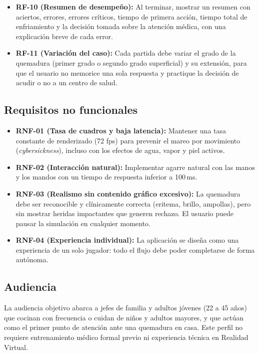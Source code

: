 \documentclass[11pt,letterpaper]{article}
\begin{document}
\begin{itemize}
  \item \textbf{RF-10 (Resumen de desempeño):} Al terminar, mostrar un resumen con aciertos, errores, errores críticos, tiempo de primera acción, tiempo total de enfriamiento y la decisión tomada sobre la atención médica, con una explicación breve de cada error.
  \item \textbf{RF-11 (Variación del caso):} Cada partida debe variar el grado de la quemadura (primer grado o segundo grado superficial) y su extensión, para que el usuario no memorice una sola respuesta y practique la decisión de acudir o no a un centro de salud.
\end{itemize}

\subsection{Requisitos no funcionales}

\begin{itemize}
  \item \textbf{RNF-01 (Tasa de cuadros y baja latencia):} Mantener una tasa constante de renderizado (72 fps) para prevenir el mareo por movimiento (\textit{cybersickness}), incluso con los efectos de agua, vapor y piel activos.
  \item \textbf{RNF-02 (Interacción natural):} Implementar agarre natural con las manos y los mandos con un tiempo de respuesta inferior a 100\,ms.
  \item \textbf{RNF-03 (Realismo sin contenido gráfico excesivo):} La quemadura debe ser reconocible y clínicamente correcta (eritema, brillo, ampollas), pero sin mostrar heridas impactantes que generen rechazo. El usuario puede pausar la simulación en cualquier momento.
  \item \textbf{RNF-04 (Experiencia individual):} La aplicación se diseña como una experiencia de un solo jugador: todo el flujo debe poder completarse de forma autónoma.
\end{itemize}

\subsection{Audiencia}

La audiencia objetivo abarca a jefes de familia y adultos jóvenes (22 a 45 años) que cocinan con frecuencia o cuidan de niños y adultos mayores, y que actúan como el primer punto de atención ante una quemadura en casa. Este perfil no requiere entrenamiento médico formal previo ni experiencia técnica en Realidad Virtual.
\end{document}
